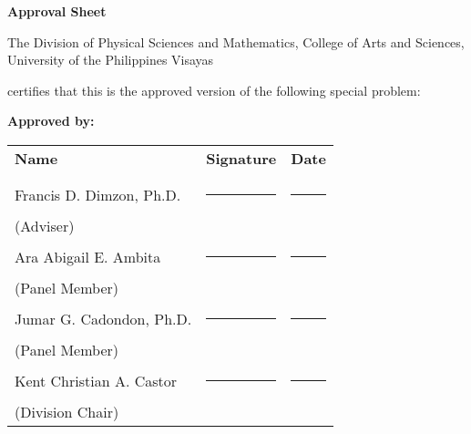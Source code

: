 \begin{center}
	\textbf{Approval Sheet}
	
	The Division of Physical Sciences and Mathematics, College of Arts and Sciences, University of the Philippines Visayas 
	
	certifies that this is the approved version of the following special problem:
	
\end{center}

{\small\textbf{Approved by:}}

\newcommand{\signaturerule}{\rule{10em}{.4pt}}
\begin{tabular}{lll}
	\bfseries Name  & \bfseries Signature & \bfseries Date\\ \\
	Francis D. Dimzon, Ph.D. &\signaturerule  & \signaturerule\\ 
	\multicolumn{1}{l}{(Adviser)} \\ 
	Ara Abigail E. Ambita &\signaturerule &\signaturerule\\
	\multicolumn{1}{l}{(Panel Member)}  \\
	Jumar G. Cadondon, Ph.D. &\signaturerule &\signaturerule\\
	\multicolumn{1}{l}{(Panel Member)}  \\
	Kent Christian A. Castor &\signaturerule &\signaturerule\\
	\multicolumn{1}{l}{(Division Chair)}
	
\end{tabular}
